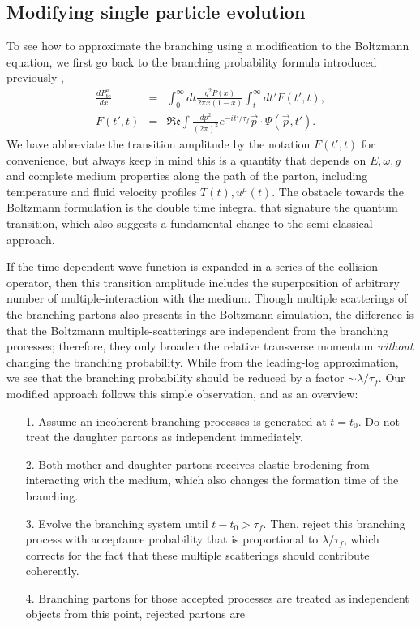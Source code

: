 \subsection{Modifying single particle evolution}
To see how to approximate the branching using a modification to the Boltzmann equation, we first go back to the branching probability formula introduced previously \cite{CaronHuot:2010bp},
\begin{eqnarray}
\frac{dP^{a}_{bc}}{dx} &=& \int_0^\infty dt \frac{g^2 P(x)}{2\pi x (1-x) } \int_t^\infty dt'  F(t', t),
\label{eq:full-theory}
\\
F(t', t) &=& \mathfrak{Re} \int \frac{dp^2}{(2\pi)^2} e^{-it'/\tau_f} \vec{p}\cdot \Psi(\vec{p}, t').
\end{eqnarray}
We have abbreviate the transition amplitude by the notation $F(t', t)$ for convenience, but always keep in mind this is a quantity that depends on $E, \omega, g$ and complete medium properties along the path of the parton, including temperature and fluid velocity profiles $T(t), u^\mu(t)$.
The obstacle towards the Boltzmann formulation is the double time integral that signature the quantum transition, which also suggests a fundamental change to the semi-classical approach.

If the time-dependent wave-function is expanded in a series of the collision operator, then this transition amplitude includes the superposition of arbitrary number of multiple-interaction with the medium.
Though multiple scatterings of the branching partons also presents in the Boltzmann simulation, the difference is that the Boltzmann multiple-scatterings are independent from the branching processes; therefore, they only broaden the relative transverse momentum {\it without} changing the branching probability.
While from the leading-log approximation, we see that the branching probability should be reduced by a factor $\sim \lambda/\tau_f$.
Our modified approach follows this simple observation, and as an overview:
\begin{itemize}
\item[1.] Assume an incoherent branching processes is generated at $t=t_0$. Do not treat the daughter partons as independent immediately.
\item[2.] Both mother and daughter partons receives elastic brodening from interacting with the medium, which also changes the formation time of the branching.
\item[3.] Evolve the branching system until $t-t_0 > \tau_f$. Then, reject this branching process with acceptance probability that is proportional to $\lambda/\tau_f$, which corrects for the fact that these multiple scatterings should contribute coherently.
\item[4.] Branching partons for those accepted processes are treated as independent objects from this point, rejected partons are
\end{itemize}

